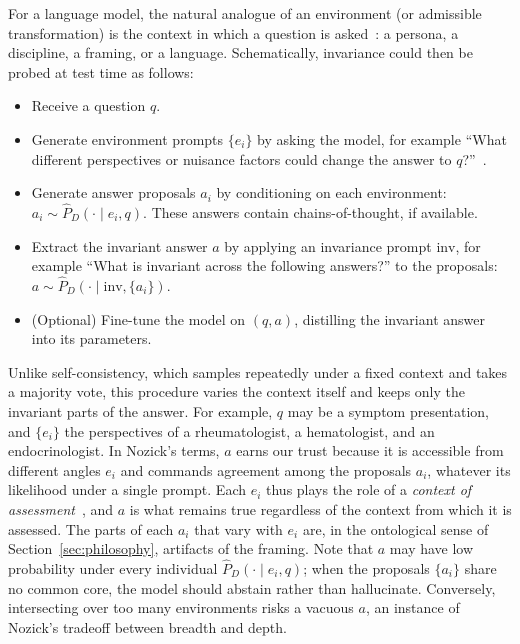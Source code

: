 For a language model, the natural analogue of an environment (or admissible transformation) is the context in which a question is asked~\citep{gupta2024context}: a persona, a discipline, a framing, or a language. Schematically, invariance could then be probed at test time as follows:
\begin{itemize}
    \item Receive a question $q$.
    \item Generate environment prompts $\{e_i\}$ by asking the model, for example ``What different perspectives or nuisance factors could change the answer to $q$?''~\citep[cf.][]{wang2024unleashing}.
    \item Generate answer proposals $a_i$ by conditioning on each environment: $a_i \sim \hat{P}_D(\cdot \mid e_i, q)$. These answers contain chains-of-thought, if available. 
    \item Extract the invariant answer $a$ by applying an invariance prompt $\mathrm{inv}$, for example ``What is invariant across the following answers?'' to the proposals: $a \sim \hat{P}_D(\cdot \mid \mathrm{inv}, \{a_i\})$.
    \item (Optional) Fine-tune the model on $(q, a)$, distilling the invariant answer into its parameters.
\end{itemize}
Unlike self-consistency, which samples repeatedly under a fixed context and takes a majority vote, this procedure varies the context itself and keeps only the invariant parts of the answer. For example, $q$ may be a symptom presentation, and $\{e_i\}$ the perspectives of a rheumatologist, a hematologist, and an endocrinologist. In Nozick's terms, $a$ earns our trust because it is accessible from different angles $e_i$ and commands agreement among the proposals $a_i$, whatever its likelihood under a single prompt. Each $e_i$ thus plays the role of a \emph{context of assessment}~\citep{macfarlane2014assessment}, and $a$ is what remains true regardless of the context from which it is assessed. The parts of each $a_i$ that vary with $e_i$ are, in the ontological sense of Section~\ref{sec:philosophy}, artifacts of the framing. Note that $a$ may have low probability under every individual $\hat{P}_D(\cdot \mid e_i, q)$; when the proposals $\{a_i\}$ share no common core, the model should abstain rather than hallucinate. Conversely, intersecting over too many environments risks a vacuous $a$, an instance of Nozick's tradeoff between breadth and depth. 

